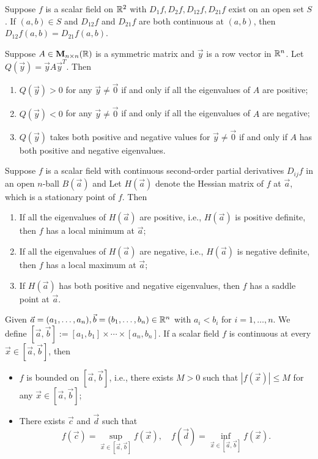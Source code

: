 \documentclass[a4paper]{ctexart}
\begin{document}
    \begin{mylma}
        Suppose $f$ is a scalar field on $\mathbb{R}^2$ with $D_1 f, D_2 f, D_{12} f, D_{21} f$ exist on an open set $S$. If $(a,b) \in S$ and $D_{12} f$ and $D_{21} f$ are both continuous at $(a,b)$, then $D_{12} f(a,b) = D_{21} f(a,b)$.
    \end{mylma}
    \begin{mylma}
        Suppose $A\in \mathbf M_{n\times n}(\mathbb{R})$ is a symmetric matrix and $\vec y $ is a row vector in $\mathbb{R}^n$. Let $Q(\vec y) = \vec y A \vec y^T$. Then
        \begin{enumerate}
            \item $Q(\vec y) > 0$ for any $\vec y \ne \vec 0$ if and only if all the eigenvalues of $A$ are positive;
            \item $Q(\vec y) < 0$ for any $\vec y \ne \vec 0$ if and only if all the eigenvalues of $A$ are negative;
            \item $Q(\vec y)$ takes both positive and negative values for $\vec y \ne \vec 0$ if and only if $A$ has both positive and negative eigenvalues.
        \end{enumerate}
    \end{mylma}
    \begin{mythm}
        Suppose $f$ is a scalar field with continuous second-order partial derivatives $D_{ij} f$ in an open $n$-ball $B(\vec a)$ and Let $H(\vec a)$ denote the Hessian matrix of $f$ at $\vec a$, which is a stationary point of $f$. Then
        \begin{enumerate}
            \item If all the eigenvalues of $H(\vec a)$ are positive, i.e., $H(\vec a)$ is positive definite, then $f$ has a local minimum at $\vec a$;
            \item If all the eigenvalues of $H(\vec a)$ are negative, i.e., $H(\vec a)$ is negative definite, then $f$ has a local maximum at $\vec a$;
            \item If $H(\vec a)$ has both positive and negative eigenvalues, then $f$ has a saddle point at $\vec a$.
        \end{enumerate}
    \end{mythm}
    \begin{mythm}
        Given $\vec a = (a_1, \ldots, a_n), \vec b = (b_1, \ldots, b_n) \in \mathbb{R}^n$ with $a_i < b_i$ for $i=1, \ldots, n$. We define $\left[ \vec a, \vec b \right] := [a_1, b_1] \times \cdots \times [a_n, b_n]$. If a scalar field $f$ is continuous at every $\vec x \in [\vec a, \vec b]$, then
        \begin{itemize}
            \item $f$ is bounded on $[\vec a, \vec b]$, i.e., there exists $M>0$ such that $|f(\vec x)| \le M$ for any $\vec x \in [\vec a, \vec b]$;
            \item There exists $\vec c$ and $\vec d$ such that
            $$ f(\vec c) = \sup_{\vec x \in [\vec a, \vec b]} f(\vec x),\quad f(\vec d) = \inf_{\vec x \in [\vec a, \vec b]} f(\vec x). $$
        \end{itemize}
    \end{mythm}
\end{document}
